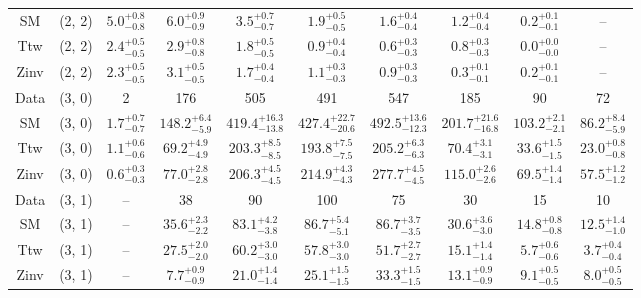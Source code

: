 \begin{table}[h!]
{\begin{tabular}{cccccccccc}
	SM & (2, 2) & $5.0^{+ 0.8 }_{- 0.8 }$ & $6.0^{+ 0.9 }_{- 0.9 }$ & $3.5^{+ 0.7 }_{- 0.7 }$ & $1.9^{+ 0.5 }_{- 0.5 }$ & $1.6^{+ 0.4 }_{- 0.4 }$ & $1.2^{+ 0.4 }_{- 0.4 }$ & $0.2^{+ 0.1 }_{- 0.1 }$ & -- \\[0.5ex] 
	Ttw & (2, 2) & $2.4^{+ 0.5 }_{- 0.5 }$ & $2.9^{+ 0.8 }_{- 0.8 }$ & $1.8^{+ 0.5 }_{- 0.5 }$ & $0.9^{+ 0.4 }_{- 0.4 }$ & $0.6^{+ 0.3 }_{- 0.3 }$ & $0.8^{+ 0.3 }_{- 0.3 }$ & $0.0^{+ 0.0 }_{- 0.0 }$ & -- \\[0.5ex] 
	Zinv & (2, 2) & $2.3^{+ 0.5 }_{- 0.5 }$ & $3.1^{+ 0.5 }_{- 0.5 }$ & $1.7^{+ 0.4 }_{- 0.4 }$ & $1.1^{+ 0.3 }_{- 0.3 }$ & $0.9^{+ 0.3 }_{- 0.3 }$ & $0.3^{+ 0.1 }_{- 0.1 }$ & $0.2^{+ 0.1 }_{- 0.1 }$ & -- \\[0.5ex] 
	Data & (3, 0) & 2 & 176 & 505 & 491 & 547 & 185 & 90 & 72 \\[0.5ex] 
	SM & (3, 0) & $1.7^{+ 0.7 }_{- 0.7 }$ & $148.2^{+ 6.4 }_{- 5.9 }$ & $419.4^{+ 16.3 }_{- 13.8 }$ & $427.4^{+ 22.7 }_{- 20.6 }$ & $492.5^{+ 13.6 }_{- 12.3 }$ & $201.7^{+ 21.6 }_{- 16.8 }$ & $103.2^{+ 2.1 }_{- 2.1 }$ & $86.2^{+ 8.4 }_{- 5.9 }$ \\[0.5ex] 
	Ttw & (3, 0) & $1.1^{+ 0.6 }_{- 0.6 }$ & $69.2^{+ 4.9 }_{- 4.9 }$ & $203.3^{+ 8.5 }_{- 8.5 }$ & $193.8^{+ 7.5 }_{- 7.5 }$ & $205.2^{+ 6.3 }_{- 6.3 }$ & $70.4^{+ 3.1 }_{- 3.1 }$ & $33.6^{+ 1.5 }_{- 1.5 }$ & $23.0^{+ 0.8 }_{- 0.8 }$ \\[0.5ex] 
	Zinv & (3, 0) & $0.6^{+ 0.3 }_{- 0.3 }$ & $77.0^{+ 2.8 }_{- 2.8 }$ & $206.3^{+ 4.5 }_{- 4.5 }$ & $214.9^{+ 4.3 }_{- 4.3 }$ & $277.7^{+ 4.5 }_{- 4.5 }$ & $115.0^{+ 2.6 }_{- 2.6 }$ & $69.5^{+ 1.4 }_{- 1.4 }$ & $57.5^{+ 1.2 }_{- 1.2 }$ \\[0.5ex] 
	Data & (3, 1) & -- & 38 & 90 & 100 & 75 & 30 & 15 & 10 \\[0.5ex] 
	SM & (3, 1) & -- & $35.6^{+ 2.3 }_{- 2.2 }$ & $83.1^{+ 4.2 }_{- 3.8 }$ & $86.7^{+ 5.4 }_{- 5.1 }$ & $86.7^{+ 3.7 }_{- 3.5 }$ & $30.6^{+ 3.6 }_{- 3.0 }$ & $14.8^{+ 0.8 }_{- 0.8 }$ & $12.5^{+ 1.4 }_{- 1.0 }$ \\[0.5ex] 
	Ttw & (3, 1) & -- & $27.5^{+ 2.0 }_{- 2.0 }$ & $60.2^{+ 3.0 }_{- 3.0 }$ & $57.8^{+ 3.0 }_{- 3.0 }$ & $51.7^{+ 2.7 }_{- 2.7 }$ & $15.1^{+ 1.4 }_{- 1.4 }$ & $5.7^{+ 0.6 }_{- 0.6 }$ & $3.7^{+ 0.4 }_{- 0.4 }$ \\[0.5ex] 
	Zinv & (3, 1) & -- & $7.7^{+ 0.9 }_{- 0.9 }$ & $21.0^{+ 1.4 }_{- 1.4 }$ & $25.1^{+ 1.5 }_{- 1.5 }$ & $33.3^{+ 1.5 }_{- 1.5 }$ & $13.1^{+ 0.9 }_{- 0.9 }$ & $9.1^{+ 0.5 }_{- 0.5 }$ & $8.0^{+ 0.5 }_{- 0.5 }$ \\[0.5ex] 

\end{tabular}}
\end{table}
